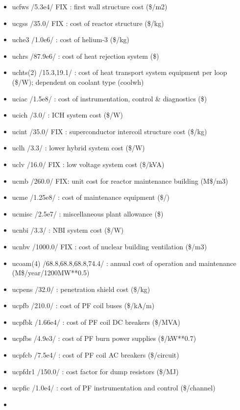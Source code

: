 \documentclass[
]{article}
\begin{document}
\begin{itemize}
\begin{itemize}
  \item
    ucfws /5.3e4/ FIX : first wall structure cost (\$/m2)
  \item
    ucgss /35.0/ FIX : cost of reactor structure (\$/kg)
  \item
    uche3 /1.0e6/ : cost of helium-3 (\$/kg)
  \item
    uchrs /87.9e6/ : cost of heat rejection system (\$)
  \item
    uchts(2) /15.3,19.1/ : cost of heat transport system equipment per
    loop (\$/W); dependent on coolant type (coolwh)
  \item
    uciac /1.5e8/ : cost of instrumentation, control \& diagnostics (\$)
  \item
    ucich /3.0/ : ICH system cost (\$/W)
  \item
    ucint /35.0/ FIX : superconductor intercoil structure cost (\$/kg)
  \item
    uclh /3.3/ : lower hybrid system cost (\$/W)
  \item
    uclv /16.0/ FIX : low voltage system cost (\$/kVA)
  \item
    ucmb /260.0/ FIX: unit cost for reactor maintenance building
    (M\$/m3)
  \item
    ucme /1.25e8/ : cost of maintenance equipment (\$/)
  \item
    ucmisc /2.5e7/ : miscellaneous plant allowance (\$)
  \item
    ucnbi /3.3/ : NBI system cost (\$/W)
  \item
    ucnbv /1000.0/ FIX : cost of nuclear building ventilation (\$/m3)
  \item
    ucoam(4) /68.8,68.8,68.8,74.4/ : annual cost of operation and
    maintenance (M\$/year/1200MW**0.5)
  \item
    ucpens /32.0/ : penetration shield cost (\$/kg)
  \item
    ucpfb /210.0/ : cost of PF coil buses (\$/kA/m)
  \item
    ucpfbk /1.66e4/ : cost of PF coil DC breakers (\$/MVA)
  \item
    ucpfbs /4.9e3/ : cost of PF burn power supplies (\$/kW**0.7)
  \item
    ucpfcb /7.5e4/ : cost of PF coil AC breakers (\$/circuit)
  \item
    ucpfdr1 /150.0/ : cost factor for dump resistors (\$/MJ)
  \item
    ucpfic /1.0e4/ : cost of PF instrumentation and control (\$/channel)
  \item

\end{itemize}
\end{itemize}
\end{document}
